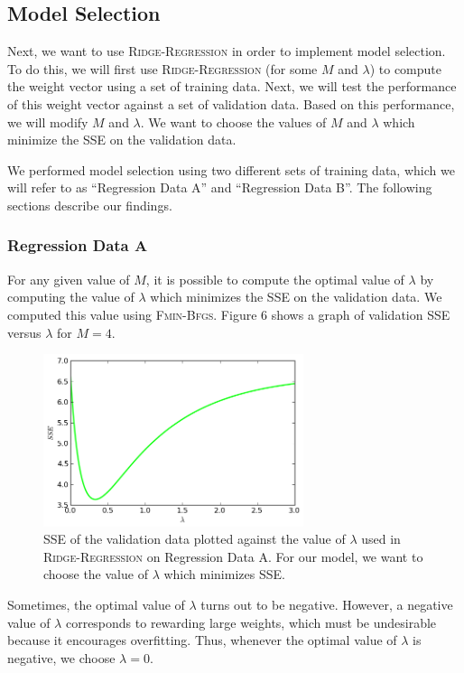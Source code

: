 \documentclass{sigchi}
\begin{document}
\subsection{Model Selection}

Next, we want to use \textsc{Ridge-Regression} in order to implement model selection. To do this, we will first use \textsc{Ridge-Regression}  (for some $M$ and $\lambda$) to compute the weight vector using a set of training data. Next, we will test the performance of this weight vector against a set of validation data. Based on this performance, we will modify $M$ and $\lambda$. We want to choose the values of $M$ and $\lambda$ which minimize the SSE on the validation data.

We performed model selection using two different sets of training data, which we will refer to as ``Regression Data A'' and ``Regression Data B''. The following sections describe our findings.

\subsubsection{Regression Data A}

For any given value of $M$, it is possible to compute the optimal value of $\lambda$ by computing the value of $\lambda$ which minimizes the SSE on the validation data. We computed this value using \textsc{Fmin-Bfgs}. Figure 6 shows a graph of validation SSE versus $\lambda$ for $M = 4$.

\begin{figure}[!t]
\centering
\includegraphics[width=3in]{min_lam.png}
\caption{SSE of the validation data plotted against the value of $\lambda$ used in \textsc{Ridge-Regression} on Regression Data A. For our model, we want to choose the value of $\lambda$ which minimizes SSE.}
\end{figure}

Sometimes, the optimal value of $\lambda$ turns out to be negative. However, a negative value of $\lambda$ corresponds to rewarding large weights, which must be undesirable because it encourages overfitting. Thus, whenever the optimal value of $\lambda$ is negative, we choose $\lambda = 0$.
\end{document}
